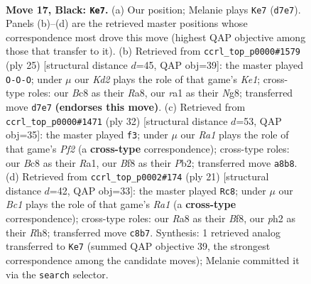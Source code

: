 \documentclass[11pt]{article}
\begin{document}
\clearpage

\begin{figure}[p]\centering
\begin{subfigure}{0.46\textwidth}\centering
\resizebox{\linewidth}{!}{%
\newchessgame
\chessboard[
  setfen={r1b2bnr/p2k2pp/2pp4/5p2/2N2B2/3B1P2/PPP3PP/R2R2K1 b - - 9 17},
  showmover=false,
  pgfstyle=straightmove, color=movearrow, markmove={d7-e7}
]}
\caption{}
\end{subfigure}\hfill
\begin{subfigure}{0.46\textwidth}\centering
\resizebox{\linewidth}{!}{%
\newchessgame
\chessboard[
  setfen={r3k1nr/1p1b1ppp/p2bp3/8/3N4/8/PPP1BPPP/R1BR2K1 b kq - 4 13},
  showmover=false,
  pgfstyle=straightmove, color=movearrow, markmove={e8-c8}
]}
\caption{}
\end{subfigure}
\\[4pt]
\begin{subfigure}{0.46\textwidth}\centering
\resizebox{\linewidth}{!}{%
\newchessgame
\chessboard[
  setfen={r1r5/p3ppkp/4b1p1/2n5/4P3/2N5/PP3PPP/R3KB1R w KQ - 0 17},
  showmover=false,
  pgfstyle=straightmove, color=movearrow, markmove={f2-f3}
]}
\caption{}
\end{subfigure}\hfill
\begin{subfigure}{0.46\textwidth}\centering
\resizebox{\linewidth}{!}{%
\newchessgame
\chessboard[
  setfen={r3kb1r/pp1b1ppp/2n1p3/8/2B5/2P1BN2/PPK2PPP/R6R b kq - 4 11},
  showmover=false,
  pgfstyle=straightmove, color=movearrow, markmove={a8-c8}
]}
\caption{}
\end{subfigure}
\caption{\textbf{Move 17, Black: \texttt{Ke7}.} (a) Our position; Melanie plays \texttt{Ke7} (\texttt{d7e7}). Panels (b)--(d) are the retrieved master positions whose correspondence most drove this move (highest QAP objective among those that transfer to it). (b) Retrieved from \texttt{ccrl\_top\_p0000\#1579} (ply 25) [structural distance $d$=45, QAP obj=39]: the master played \texttt{O-O-O}; under $\mu$ our \emph{Kd2} plays the role of that game's \emph{Ke1}; cross-type roles: our \emph{B}c8 as their \emph{R}a8, our \emph{r}a1 as their \emph{N}g8; transferred move \texttt{d7e7} \textbf{(endorses this move)}. (c) Retrieved from \texttt{ccrl\_top\_p0000\#1471} (ply 32) [structural distance $d$=53, QAP obj=35]: the master played \texttt{f3}; under $\mu$ our \emph{Ra1} plays the role of that game's \emph{Pf2} (a \textbf{cross-type} correspondence); cross-type roles: our \emph{B}c8 as their \emph{R}a1, our \emph{B}f8 as their \emph{P}b2; transferred move \texttt{a8b8}. (d) Retrieved from \texttt{ccrl\_top\_p0002\#174} (ply 21) [structural distance $d$=42, QAP obj=33]: the master played \texttt{Rc8}; under $\mu$ our \emph{Bc1} plays the role of that game's \emph{Ra1} (a \textbf{cross-type} correspondence); cross-type roles: our \emph{R}a8 as their \emph{B}f8, our \emph{p}h2 as their \emph{R}h8; transferred move \texttt{c8b7}. Synthesis: 1 retrieved analog transferred to \texttt{Ke7} (summed QAP objective 39, the strongest correspondence among the candidate moves); Melanie committed it via the \texttt{search} selector.}
\label{fig:thought-m33}
\end{figure}
\end{document}
